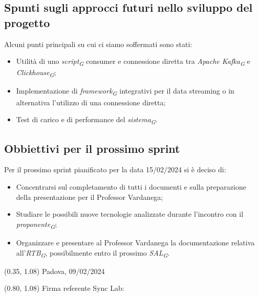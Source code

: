 \documentclass{article}
\begin{document}
    \subsection{Spunti sugli approcci futuri nello sviluppo del progetto}
    Alcuni punti principali su cui ci siamo soffermati sono stati:
    \begin{itemize}
        \item Utilità di uno \textit{script}\textsubscript{\textit{G}} consumer e connessione diretta tra \textit{Apache Kafka}\textsubscript{\textit{G}} e \textit{Clickhouse}\textsubscript{\textit{G}};
        \item Implementazione di \textit{framework}\textsubscript{\textit{G}} integrativi per il data streaming o in alternativa l'utilizzo di una connessione diretta;
        \item Test di carico e di performance del \textit{sistema}\textsubscript{\textit{G}}.
        \end{itemize}

    \subsection{Obbiettivi per il prossimo sprint}
    
    Per il prossimo sprint pianificato per la data 15/02/2024 si è deciso di: 
    \begin{itemize}
        \item Concentrarsi sul completamento di tutti i documenti e sulla preparazione della presentazione per il Professor Vardanega;
        \item Studiare le possibili nuove tecnologie analizzate durante l'incontro con il \textit{proponente}\textsubscript{\textit{G}}; 
        \item Organizzare e presentare al Professor Vardanega la documentazione relativa all'\textit{RTB}\textsubscript{\textit{G}}, possibilmente entro il prossimo \textit{SAL}\textsubscript{\textit{G}}.
    \end{itemize}

    \pagebreak 


\begin{textblock*}{\textwidth}(0.35\textwidth, 1.08\textheight)
    Padova, 09/02/2024
\end{textblock*}

\begin{textblock*}{\textwidth}(0.80\textwidth, 1.08\textheight)
        Firma referente Sync Lab:
\end{textblock*}
\end{document}
